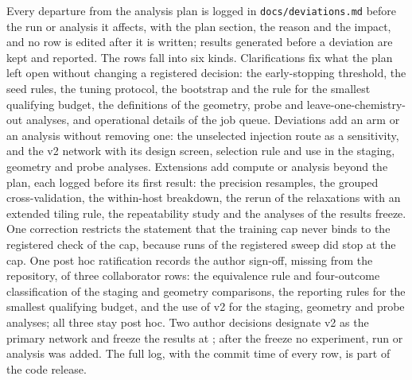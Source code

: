 Every departure from the analysis plan is logged in \texttt{docs/deviations.md} before the run or analysis it
affects, with the plan section, the reason and the impact, and no row is edited after it is written; results
generated before a deviation are kept and reported. The rows fall into six kinds. Clarifications fix what the plan
left open without changing a registered decision: the early-stopping threshold, the seed rules, the tuning protocol,
the bootstrap and the rule for the smallest qualifying budget, the definitions of the geometry, probe and
leave-one-chemistry-out analyses, and operational details of the job queue. Deviations add an arm or an analysis
without removing one: the unselected injection route as a sensitivity, and the v2 network with its design screen,
selection rule and use in the staging, geometry and probe analyses. Extensions add compute or analysis beyond the
plan, each logged before its first result: the precision resamples, the grouped cross-validation, the within-host
breakdown, the rerun of the relaxations with an extended tiling rule, the repeatability study and the analyses of
the results freeze. One correction restricts the statement that the training cap never binds to the registered
check of the cap, because runs of the registered sweep did stop at the cap. One post hoc ratification records the
author sign-off, missing from the repository, of three collaborator rows: the equivalence rule and four-outcome
classification of the staging and geometry comparisons, the reporting rules for the smallest qualifying budget, and
the use of v2 for the staging, geometry and probe analyses; all three stay post hoc. Two author decisions designate v2 as the primary network and freeze the results at \tagresults{}; after the
freeze no experiment, run or analysis was added. The full log, with the commit time of every row, is part of the
code release.
